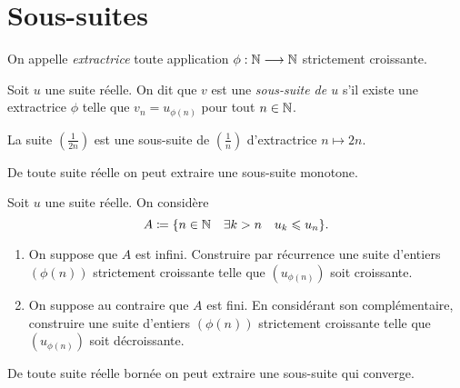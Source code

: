 \documentclass[../main.tex]{subfiles}
\begin{document}

\section{Sous-suites}

\begin{mydef}[Extractrice]
	On appelle \textit{extractrice} toute application $\phi:\mathbb N\longrightarrow\mathbb N$ strictement croissante.
\end{mydef}

\begin{mydef}
	Soit $u$ une suite réelle. On dit que $v$ est une \textit{sous-suite de $u$} s'il existe une extractrice $\phi$ telle que $v_n=u_{\phi(n)}$ pour tout $n\in\mathbb N$.
\end{mydef}

\begin{exe}
	La suite $\left(\frac{1}{2n}\right)$ est une sous-suite de $\left(\frac{1}{n}\right)$ d'extractrice $n\mapsto 2n$.
\end{exe}

\begin{lem}
	De toute suite réelle on peut extraire une sous-suite monotone.
\end{lem}

\begin{exo}[Démonstration, D]
	Soit $u$ une suite réelle. On considère 
	\[A\coloneqq \{n\in\mathbb N\quad \exists k>n\quad u_k\leqslant u_n\}.\]
	\begin{enumerate}
		\item On suppose que $A$ est infini. Construire par récurrence une suite d'entiers $(\phi(n))$ strictement croissante telle que $(u_{\phi(n)})$ soit croissante.
		\item On suppose au contraire que $A$ est fini. En considérant son complémentaire, construire une suite d'entiers $(\phi(n))$ strictement croissante telle que $(u_{\phi(n)})$ soit décroissante.
	\end{enumerate}
\end{exo}

\begin{thm}
	De toute suite réelle bornée on peut extraire une sous-suite qui converge.
\end{thm}
\end{document}
